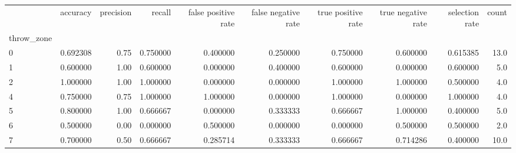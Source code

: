 \begin{tabular}{lrrrrrrrrr}
\toprule
{} &  accuracy &  precision &    recall &  false positive rate &  false negative rate &  true positive rate &  true negative rate &  selection rate &  count \\
throw\_zone &           &            &           &                      &                      &                     &                     &                 &        \\
\midrule
0          &  0.692308 &       0.75 &  0.750000 &             0.400000 &             0.250000 &            0.750000 &            0.600000 &        0.615385 &   13.0 \\
1          &  0.600000 &       1.00 &  0.600000 &             0.000000 &             0.400000 &            0.600000 &            0.000000 &        0.600000 &    5.0 \\
2          &  1.000000 &       1.00 &  1.000000 &             0.000000 &             0.000000 &            1.000000 &            1.000000 &        0.500000 &    4.0 \\
4          &  0.750000 &       0.75 &  1.000000 &             1.000000 &             0.000000 &            1.000000 &            0.000000 &        1.000000 &    4.0 \\
5          &  0.800000 &       1.00 &  0.666667 &             0.000000 &             0.333333 &            0.666667 &            1.000000 &        0.400000 &    5.0 \\
6          &  0.500000 &       0.00 &  0.000000 &             0.500000 &             0.000000 &            0.000000 &            0.500000 &        0.500000 &    2.0 \\
7          &  0.700000 &       0.50 &  0.666667 &             0.285714 &             0.333333 &            0.666667 &            0.714286 &        0.400000 &   10.0 \\
\bottomrule
\end{tabular}
